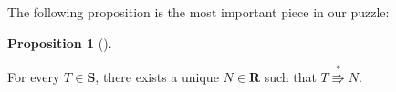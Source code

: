 \documentclass[numbers=enddot,12pt,final,onecolumn,notitlepage]{scrartcl}%
\theoremstyle{definition}
\newtheorem{prop}[theo]{Proposition}
\newenvironment{proposition}[1][]
{\begin{prop}[#1]\begin{leftbar}}
{\end{leftbar}\end{prop}}
\begin{document}
The following proposition is the most important piece in our puzzle:

\begin{proposition}
\label{prop.BK.norm}For every $T\in\mathbf{S}$, there exists a unique
$N\in\mathbf{R}$ such that $T\overset{\ast}{\Rrightarrow}N$.
\end{proposition}

\end{document}
